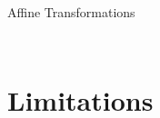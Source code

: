 \documentclass[10pt]{beamer}
\begin{document}
\begin{frame}{Affine Transformations}
\begin{columns}
\begin{column}{0.5 \textwidth}
\begin{figure}
\begin{center}
        \end{center}
      \end{figure}
        \end{column}
    \end{columns}

   
\end{frame}

    

\section{Limitations}
\end{document}
